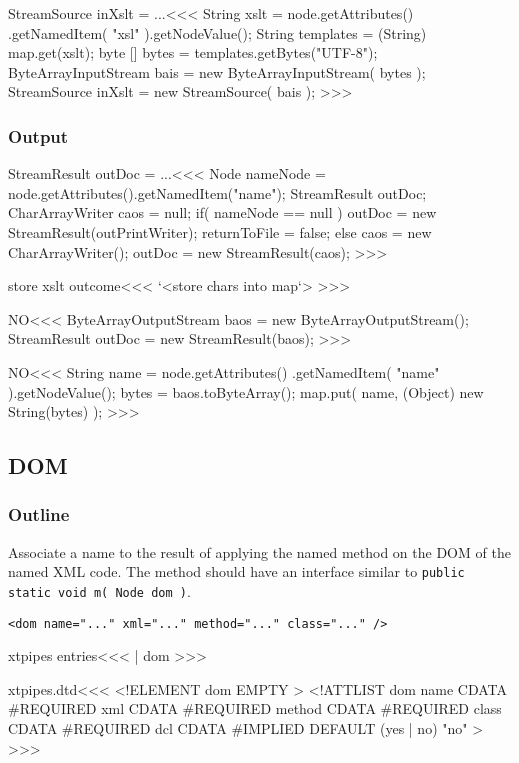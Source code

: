 \documentclass{article}
\begin{document}
{\<StreamSource inXslt = ...\><<<
String xslt = node.getAttributes()
                  .getNamedItem( "xsl" ).getNodeValue();
String templates = (String) map.get(xslt);
byte [] bytes = templates.getBytes("UTF-8");
ByteArrayInputStream bais =  new ByteArrayInputStream( bytes );
StreamSource inXslt = new StreamSource( bais );
>>>


\subsubsection{Output}



\<StreamResult outDoc = ...\><<<
Node nameNode = node.getAttributes().getNamedItem("name");
StreamResult outDoc;
CharArrayWriter caos = null;
if( nameNode == null ){
   outDoc = new StreamResult(outPrintWriter);
   returnToFile = false;
} else {
   caos = new CharArrayWriter();
   outDoc  = new StreamResult(caos);
}
>>>


\<store xslt outcome\><<<
`<store chars into map`>
>>>





\<NO\><<<
ByteArrayOutputStream baos = new ByteArrayOutputStream();
StreamResult outDoc  = new StreamResult(baos);
>>>


\<NO\><<<
String name = node.getAttributes()
                .getNamedItem( "name" ).getNodeValue();
bytes = baos.toByteArray();
map.put( name, (Object) new String(bytes) );
>>>


\subsection{DOM}


\subsubsection{Outline}


Associate a name to the result of applying the named method on the DOM
of the named XML code. The method should have an interface similar to
\verb+public static void m( Node dom )+.

\begin{verbatim}
<dom name="..." xml="..." method="..." class="..." />
\end{verbatim}


\<xtpipes entries\><<<
| dom
>>>


\<xtpipes.dtd\><<<
<!ELEMENT dom EMPTY >
<!ATTLIST dom
          name   CDATA #REQUIRED
          xml    CDATA #REQUIRED
          method CDATA #REQUIRED
          class  CDATA #REQUIRED
          dcl    CDATA #IMPLIED DEFAULT (yes | no) "no"
>
>>>



}
\end{document}
